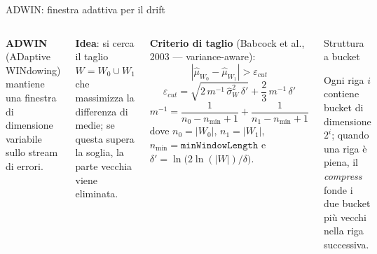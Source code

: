 \documentclass[aspectratio=169,10pt]{beamer}
\begin{document}
\begin{frame}{ADWIN: finestra adattiva per il drift}
  \begin{columns}[T]
    \textbf{ADWIN} (ADaptive WINdowing) \cite{Bifet2007} mantiene una
    \alert{finestra di dimensione variabile} sullo stream di errori.

    \medskip
    \textbf{Idea}: si cerca il taglio $W = W_0 \cup W_1$ che massimizza
    la differenza di medie; se questa supera la soglia, la parte vecchia viene
    eliminata.

    \medskip
    \textbf{Criterio di taglio} (Babcock et al., 2003 — variance-aware):
    \[
      |\hat{\mu}_{W_0} - \hat{\mu}_{W_1}| > \varepsilon_{cut}
    \]
    \[
      \varepsilon_{cut} = \sqrt{2\,m^{-1}\,\hat{\sigma}^2_W\,\delta'}
                        + \frac{2}{3}\,m^{-1}\,\delta'
    \]
    \[
      m^{-1} = \frac{1}{n_0-n_{\min}+1}
             + \frac{1}{n_1-n_{\min}+1}
    \]
    dove $n_0=|W_0|$, $n_1=|W_1|$,
    $n_{\min}=\texttt{minWindowLength}$ e
    $\delta' = \ln\!\bigl(2\ln(|W|)/\delta\bigr)$.

    \begin{block}{Struttura a bucket}
\centering
{}

\vspace{2mm}

Ogni riga $i$ contiene bucket di dimensione $2^i$; quando una riga è
piena, il \emph{compress} fonde i due bucket più vecchi nella riga
successiva.

\end{block}
  \end{columns}
\end{frame}
\end{document}
